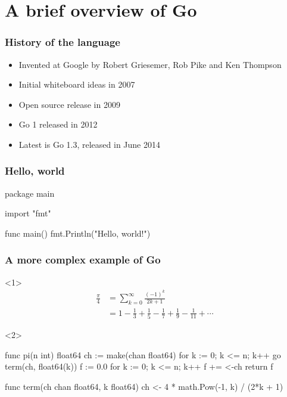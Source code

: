 \documentclass{beamer}
\begin{document}
\section{A brief overview of Go}

\begin{frame}
\frametitle{History of the language}
\begin{itemize}
  \item Invented at Google by Robert Griesemer, Rob Pike and
    Ken Thompson
  \item Initial whiteboard ideas in 2007
  \item Open source release in 2009
  \item Go 1 released in 2012
  \item Latest is Go 1.3, released in June 2014
\end{itemize}
\end{frame}

\begin{frame}[fragile]
\frametitle{Hello, world}
\begin{gocode}
package main

import "fmt"

func main() {
        fmt.Println("Hello, world!")
}
\end{gocode}
\end{frame}

\begin{frame}[fragile]
\frametitle{A more complex example of Go}
\begin{onlyenv}<1>
\begin{align*}
\frac{\pi}{4} &= \sum_{k=0}^{\infty} \frac{(-1)^k}{2k + 1} \\
              &= 1 - \frac{1}{3} + \frac{1}{5} - \frac{1}{7} +
                 \frac{1}{9} - \frac{1}{11} + \cdots
\end{align*}
\end{onlyenv}
\begin{onlyenv}<2>
\begin{gocode}
func pi(n int) float64 {
        ch := make(chan float64)
        for k := 0; k <= n; k++ {
                go term(ch, float64(k))
        }
        f := 0.0
        for k := 0; k <= n; k++ {
                f += <-ch
        }
        return f
}

func term(ch chan float64, k float64) {
        ch <- 4 * math.Pow(-1, k) / (2*k + 1)
}
\end{gocode}
\end{onlyenv}
\end{frame}
\end{document}

